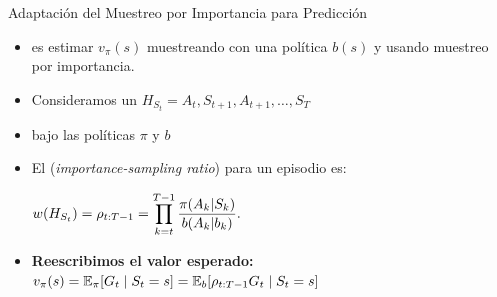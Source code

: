 \documentclass[10pt, envcountsect, handout, aspectratio=1610, hyperref={hypertexnames=true}]{beamer}
\begin{document}
\begin{frame}{Adaptación del Muestreo por Importancia para Predicción}		
	\begin{itemize}
		\item {} es estimar $v_\pi(s)$ muestreando con una política $b(s)$ y usando muestreo por importancia.
		
		\item Consideramos  un  $H_{S_t}=A_t, S_{t+1}, A_{t+1}, \dots, S_T$
		
		\item {} bajo las políticas $ \pi $ y $ b $ 
		
			
		\item El  (\textit{importance-sampling ratio}) para un episodio es:
		
		\hfil $ \displaystyle
		w(H_{S_t}) = \rho_{t:T-1} = \prod_{k=t}^{T-1} \frac{\pi(A_k|S_k)}{b(A_k|b_k)}.
		$
		
		\item \textbf{Reescribimos el valor esperado:} $\displaystyle v_\pi(s) = \mathbb{E}_\pi[G_t \mid S_t = s] = \mathbb{E}_b	[\rho_{t:T-1} G_t \mid S_t = s]$
		
	\end{itemize}

\end{frame}
\end{document}
